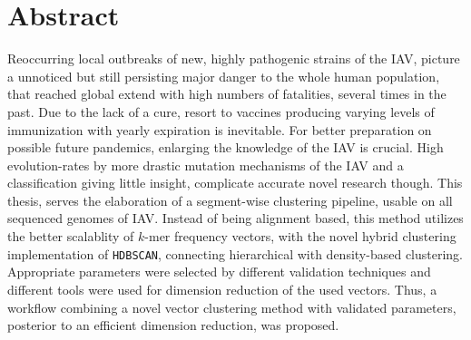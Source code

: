 \chapter*{Abstract}

Reoccurring local outbreaks of new, highly pathogenic strains of the \gls{IAV}, picture a unnoticed but still persisting major danger to the whole human population, that reached global extend with high numbers of fatalities, several times in the past. Due to the lack of a cure, resort to vaccines producing varying levels of immunization with yearly expiration is inevitable. For better preparation on possible future pandemics, enlarging the knowledge of the \gls{IAV} is crucial. High evolution-rates by more drastic mutation mechanisms of the \gls{IAV} and a classification giving little insight, complicate accurate novel research though. This thesis, serves the elaboration of a segment-wise clustering pipeline, usable on all sequenced genomes of \gls{IAV}. Instead of being alignment based, this method utilizes the better scalablity of $k$-mer frequency vectors, with the novel hybrid clustering implementation of \texttt{HDBSCAN}, connecting hierarchical with density-based clustering. Appropriate parameters were selected by different validation techniques and different tools were used for dimension reduction of the used vectors. Thus, a workflow combining a novel vector clustering method with validated parameters, posterior to an efficient dimension reduction, was proposed. 